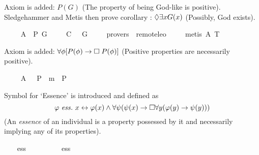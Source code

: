 \begin{isabellebody}
\begin{isamarkuptext}%
Axiom  is added: $P(G)$ (The property of being God-like is positive).
Sledgehammer and Metis then prove corollary : $\Diamond \exists x G(x)$ 
(Possibly, God exists).%
\end{isamarkuptext}%
\isamarkuptrue%
\ \ \isamarkupfalse%
\ \ A{}{\isacharcolon}\ \ {\isachardoublequoteopen}{\isacharbrackleft}P\ G{\isacharbrackright}{\isachardoublequoteclose}\ \isanewline
\isanewline
\ \ \isamarkupfalse%
\ C{\isacharcolon}\ {\isachardoublequoteopen}{\isacharbrackleft}{\isasymdiamond}\ {\isacharparenleft}{\isasymexists}\ G{\isacharparenright}{\isacharbrackright}{\isachardoublequoteclose}\ \isanewline
\ \ \isamarkupfalse%
\ {\isacharbrackleft}provers\ {\isacharequal}\ remote{\isacharunderscore}leo{}{\isacharbrackright}\ \isanewline
%
\isadelimproof
\ \ %
\endisadelimproof
%
\isatagproof
{}\isamarkupfalse%
\ {\isacharparenleft}metis\ A{}\ T{}{\isacharparenright}%
\endisatagproof
{\isafoldproof}%
%
\isadelimproof
%
\endisadelimproof
%
\begin{isamarkuptext}%
Axiom  is added: $\forall \phi [P(\phi) \to \Box \; P(\phi)]$ 
(Positive properties are necessarily positive).%
\end{isamarkuptext}%
\isamarkuptrue%
\ \ \isamarkupfalse%
\ \ A{}{\isacharcolon}\ \ {\isachardoublequoteopen}{\isacharbrackleft}{\isasymforall}{\isacharparenleft}{\isasymlambda}{\isasymphi}{\isachardot}\ P\ {\isasymphi}\ m{\isasymrightarrow}\ {\isasymbox}\ {\isacharparenleft}P\ {\isasymphi}{\isacharparenright}{\isacharparenright}{\isacharbrackright}{\isachardoublequoteclose}%
\begin{isamarkuptext}%
Symbol  for `Essence' is introduced and defined as 
$$\varphi \ \mathit{ess.} \ x \leftrightarrow \varphi(x) \wedge \forall \psi (\psi(x) \rightarrow \Box \forall y (\varphi(y) 
\rightarrow \psi(y)))$$ (An \emph{essence} of an individual is a property possessed by it and necessarily implying any of its properties).%
\end{isamarkuptext}%
\isamarkuptrue%
\ \ \isamarkupfalse%
\ ess\ {\isacharcolon}{\isacharcolon}\ {\isachardoublequoteopen}{\isacharparenleft}{\isasymmu}\ {\isasymRightarrow}\ {\isasymsigma}{\isacharparenright}\ {\isasymRightarrow}\ {\isasymmu}\ {\isasymRightarrow}\ {\isasymsigma}{\isachardoublequoteclose}\ {\isacharparenleft}\ {\isachardoublequoteopen}ess{\isachardoublequoteclose}\ {}{}{\isacharparenright}\ \isanewline

\end{isabellebody}
